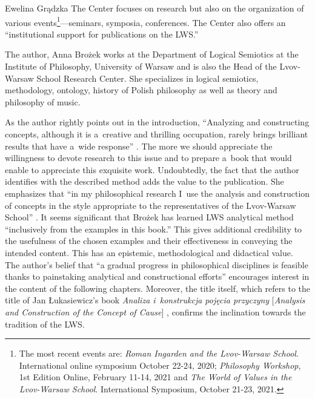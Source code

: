 \begin{newrevengenv}{Ewelina Grądzka}
 The Center focuses on research but also on the organization of various events\footnote{The most recent events are: \textit{Roman Ingarden and the Lvov-Warsaw School}. International online symposium October 22-24, 2020; \textit{Philosophy Workshop}, 1st Edition Online, February 11-14, 2021 and \textit{The World of Values in the Lvov-Warsaw School}. International Symposium, October 21-23, 2021.}---seminars, symposia, conferences. The Center also offers an ``institutional support for publications on the LWS.'' 
\parencite[][]{noauthor_lws_nodate}%


The author, Anna Brożek works at the Department of Logical Semiotics at the Institute of Philosophy, University of Warsaw and is also the Head of the Lvov-Warsaw School Research Center. She specializes in logical semiotics, methodology, ontology, history of Polish philosophy as well as theory and philosophy of music.

As the author rightly points out in the introduction, ``Analyzing and constructing concepts, although it is a~creative and thrilling occupation, rarely brings brilliant results that have a~wide response''
\parencite[][p.7]{brozek_anti-irrationalism_2020}. %
 The more we should appreciate the willingness to devote research to this issue and to prepare a~book that would enable to appreciate this exquisite work. Undoubtedly, the fact that the author identifies with the described method adds the value to the publication. She emphasizes that ``in my philosophical research I~use the analysis and construction of concepts in the style appropriate to the representatives of the Lvov-Warsaw School'' 
\parencite[][p.7]{brozek_anti-irrationalism_2020}. %
 It seems significant that Brożek has learned LWS analytical method ``inclusively from the examples in this book.'' This gives additional credibility to the usefulness of the chosen examples and their effectiveness in conveying the intended content. This has an epistemic, methodological and didactical value. The author's belief that ``a gradual progress in philosophical disciplines is feasible thanks to painstaking analytical and constructional efforts'' 
\parencite[][p.7]{brozek_anti-irrationalism_2020} %
 encourages interest in the content of the following chapters. Moreover, the title itself, which refers to the title of Jan Łukasiewicz's book \textit{Analiza i~konstrukcja pojęcia przyczyny} [\textit{Analysis and Construction of the Concept of Cause}] 
\parencite[][]{lukasiewicz_analiza_1906}, %
 confirms the inclination towards the tradition of the LWS.


\end{newrevengenv}
